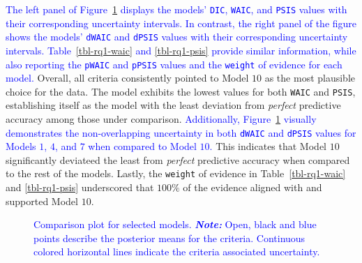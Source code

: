 \documentclass[
  authoryear,
  preprint,
  1p]{elsarticle}
\begin{document}
\textcolor{blue}{The left panel of Figure~\ref{fig-rq1-waic-psis} displays the models'
\texttt{DIC}, \texttt{WAIC}, and \texttt{PSIS} values with their
corresponding uncertainty intervals. In contrast, the right panel of the
figure shows the models' \texttt{dWAIC} and \texttt{dPSIS} values with
their corresponding uncertainty intervals. Table~\ref{tbl-rq1-waic} and
\ref{tbl-rq1-psis} provide similar information, while also reporting the
\texttt{pWAIC} and \texttt{pPSIS} values and the \texttt{weight} of
evidence for each model.} Overall, all criteria consistently pointed to
Model \(10\) as the most plausible choice for the data. The model
exhibits the lowest values for both \texttt{WAIC} and \texttt{PSIS},
establishing itself as the model with the least deviation from
\emph{perfect} predictive accuracy among those under comparison.
\textcolor{blue}{Additionally, Figure~\ref{fig-rq1-waic-psis} visually demonstrates the
non-overlapping uncertainty in both \texttt{dWAIC} and \texttt{dPSIS}
values for Models \(1\), \(4\), and \(7\) when compared to Model
\(10\).} This indicates that Model \(10\) significantly deviateed the
least from \emph{perfect} predictive accuracy when compared to the rest
of the models. Lastly, the \texttt{weight} of evidence in
Table~\ref{tbl-rq1-waic} and \ref{tbl-rq1-psis} underscored that
\(100\%\) of the evidence aligned with and supported Model \(10\).

\label{cell-fig-rq1-waic-psis}
\begin{figure}[H]


\caption{\label{fig-rq1-waic-psis}\textcolor{blue}{Comparison plot for selected models.
\textbf{\emph{Note:}} Open, black and blue points describe the posterior
means for the criteria. Continuous colored horizontal lines indicate the
criteria associated uncertainty.}}

\end{figure}%
\end{document}
